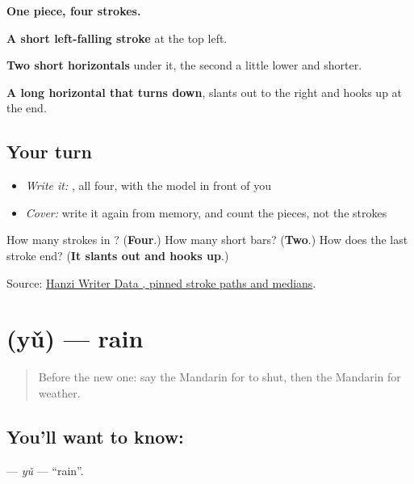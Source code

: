 \begin{quote}
\end{quote}

\textbf{One piece, four strokes.}

\textbf{A short left-falling stroke} at the top left.

\textbf{Two short horizontals} under it, the second a little lower and shorter.

\textbf{A long horizontal that turns down}, slants out to the right and hooks up at the end.

\subsection*{Your turn}
\begin{itemize}
\raggedright
  \item \emph{Write it:} , all four, with the model in front of you
  \item \emph{Cover:} write it again from memory, and count the pieces, not the strokes
\end{itemize}

\begin{tcolorbox}[breakable,colback=teal!4,colframe=teal!35!black,title={Before you move on}]
How many strokes in ? (\textbf{Four}.) How many short bars? (\textbf{Two}.) How does the last stroke end? (\textbf{It slants out and hooks up}.)

Source: \href{https://raw.githubusercontent.com/chanind/hanzi-writer-data/68d10a4b21150cae5e1ebbd223eed289cf32d90c/data/\%E6\%B0\%94.json}{Hanzi Writer Data , pinned stroke paths and medians}.
\end{tcolorbox}
\section[\texorpdfstring{\zh{雨} (yǔ)}{雨 (yǔ)}]{ (yǔ) — rain}

\label{lesson:ZH-C66-yu}



\begin{quote}
Before the new one: say the Mandarin for to shut, then the Mandarin for weather.
\end{quote}

\subsection*{You'll want to know: }
\textbf{} — \emph{yǔ} — \textquotedblleft{}rain\textquotedblright{}.


